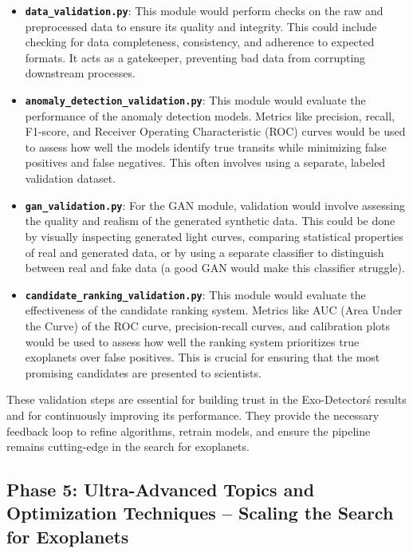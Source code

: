 \documentclass{article}
\begin{document}
\begin{itemize}
    \item \textbf{\texttt{data\_validation.py}}: This module would perform checks on the raw and preprocessed data to ensure its quality and integrity. This could include checking for data completeness, consistency, and adherence to expected formats. It acts as a gatekeeper, preventing bad data from corrupting downstream processes.

    \item \textbf{\texttt{anomaly\_detection\_validation.py}}: This module would evaluate the performance of the anomaly detection models. Metrics like precision, recall, F1-score, and Receiver Operating Characteristic (ROC) curves would be used to assess how well the models identify true transits while minimizing false positives and false negatives. This often involves using a separate, labeled validation dataset.

    \item \textbf{\texttt{gan\_validation.py}}: For the GAN module, validation would involve assessing the quality and realism of the generated synthetic data. This could be done by visually inspecting generated light curves, comparing statistical properties of real and generated data, or by using a separate classifier to distinguish between real and fake data (a good GAN would make this classifier struggle).

    \item \textbf{\texttt{candidate\_ranking\_validation.py}}: This module would evaluate the effectiveness of the candidate ranking system. Metrics like AUC (Area Under the Curve) of the ROC curve, precision-recall curves, and calibration plots would be used to assess how well the ranking system prioritizes true exoplanets over false positives. This is crucial for ensuring that the most promising candidates are presented to scientists.
\end{itemize}

These validation steps are essential for building trust in the Exo-Detector\'s results and for continuously improving its performance. They provide the necessary feedback loop to refine algorithms, retrain models, and ensure the pipeline remains cutting-edge in the search for exoplanets.

\subsection{Phase 5: Ultra-Advanced Topics and Optimization Techniques – Scaling the Search for Exoplanets}
\end{document}
